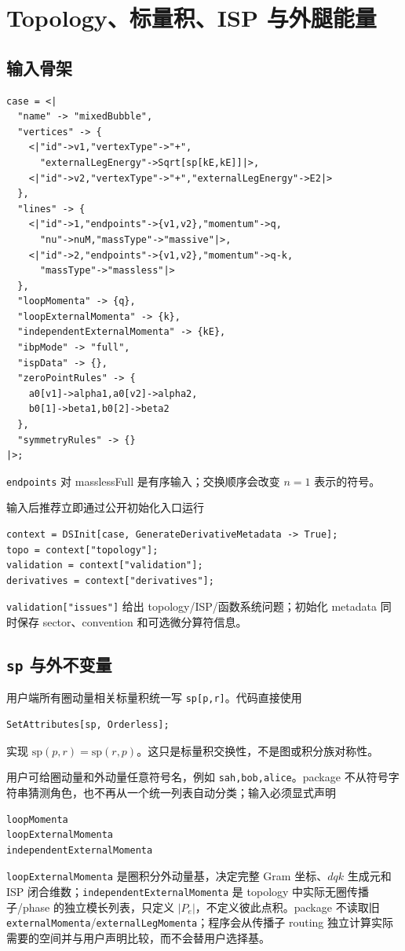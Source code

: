 ﻿\documentclass[a4paper,11pt]{article}
\begin{document}
\section{Topology、标量积、ISP 与外腿能量}

\subsection{输入骨架}

\begin{verbatim}
case = <|
  "name" -> "mixedBubble",
  "vertices" -> {
    <|"id"->v1,"vertexType"->"+",
      "externalLegEnergy"->Sqrt[sp[kE,kE]]|>,
    <|"id"->v2,"vertexType"->"+","externalLegEnergy"->E2|>
  },
  "lines" -> {
    <|"id"->1,"endpoints"->{v1,v2},"momentum"->q,
      "nu"->nuM,"massType"->"massive"|>,
    <|"id"->2,"endpoints"->{v1,v2},"momentum"->q-k,
      "massType"->"massless"|>
  },
  "loopMomenta" -> {q},
  "loopExternalMomenta" -> {k},
  "independentExternalMomenta" -> {kE},
  "ibpMode" -> "full",
  "ispData" -> {},
  "zeroPointRules" -> {
    a0[v1]->alpha1,a0[v2]->alpha2,
    b0[1]->beta1,b0[2]->beta2
  },
  "symmetryRules" -> {}
|>;
\end{verbatim}
\texttt{endpoints} 对 masslessFull 是有序输入；交换顺序会改变 $n=1$ 表示的符号。

输入后推荐立即通过公开初始化入口运行
\begin{verbatim}
context = DSInit[case, GenerateDerivativeMetadata -> True];
topo = context["topology"];
validation = context["validation"];
derivatives = context["derivatives"];
\end{verbatim}
\texttt{validation["issues"]} 给出 topology/ISP/函数系统问题；初始化 metadata 同时保存 sector、convention 和可选微分算符信息。

\subsection{\texttt{sp} 与外不变量}

用户端所有圈动量相关标量积统一写 \texttt{sp[p,r]}。代码直接使用
\begin{verbatim}
SetAttributes[sp, Orderless];
\end{verbatim}
实现 $\mathrm{sp}(p,r)=\mathrm{sp}(r,p)$。这只是标量积交换性，不是图或积分族对称性。

用户可给圈动量和外动量任意符号名，例如 \texttt{sah,bob,alice}。package 不从符号字符串猜测角色，也不再从一个统一列表自动分类；输入必须显式声明
\begin{verbatim}
loopMomenta
loopExternalMomenta
independentExternalMomenta
\end{verbatim}
\texttt{loopExternal\allowbreak Momenta} 是圈积分外动量基，决定完整 Gram 坐标、$dqk$ 生成元和 ISP 闭合维数；\texttt{independentExternal\allowbreak Momenta} 是 topology 中实际无圈传播子/phase 的独立模长列表，只定义 $|P_e|$，不定义彼此点积。package 不读取旧 \texttt{externalMomenta}/\texttt{externalLegMomenta}；程序会从传播子 routing 独立计算实际需要的空间并与用户声明比较，而不会替用户选择基。
\end{document}
